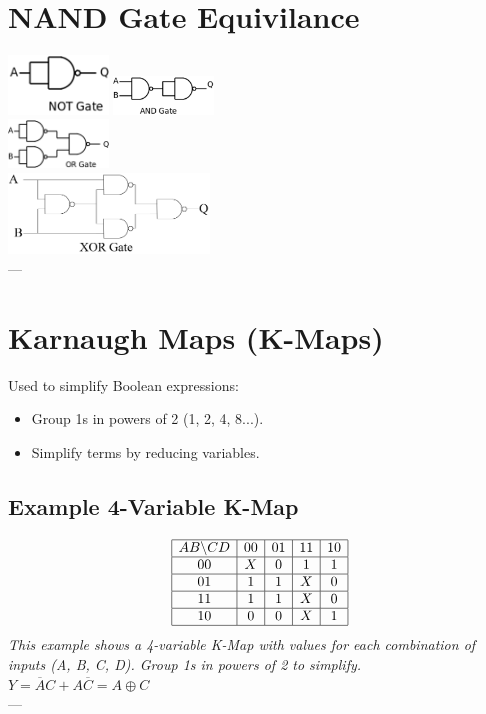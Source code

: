 \documentclass[10pt]{article}
\begin{document}
\begin{multicols}{2}
\section{NAND Gate Equivilance}
\includegraphics[width=0.2\textwidth]{NotGateFromNAND.png}
\includegraphics[width=0.2\textwidth]{AndGateFromNAND.png}\\
\includegraphics[width=0.2\textwidth]{OrGateFromNAND.png}\\
\includegraphics[width=0.4\textwidth]{XorGateFromNAND.png}\\
--- %

\section{Karnaugh Maps (K-Maps)}

Used to simplify Boolean expressions:
\begin{itemize}\itemsep0pt
    \item Group 1s in powers of 2 (1, 2, 4, 8...).
    \item Simplify terms by reducing variables.
\end{itemize}

\subsection{Example 4-Variable K-Map}
\[
\begin{array}{|c|c|c|c|c|}
\hline
AB \backslash CD & 00 & 01 & 11 & 10 \\
\hline
00 & X & 0 & 1 & 1 \\
\hline
01 & 1 & 1 & X & 0 \\
\hline
11 & 1 & 1 & X & 0 \\
\hline
10 & 0 & 0 & X & 1 \\
\hline
\end{array}
\]
\textit{This example shows a 4-variable K-Map with values for each combination of inputs (A, B, C, D). Group 1s in powers of 2 to simplify.}\\
$Y = \overline{A}C + A\overline{C} = A \oplus C$\\
--- %


\end{multicols}
\end{document}
